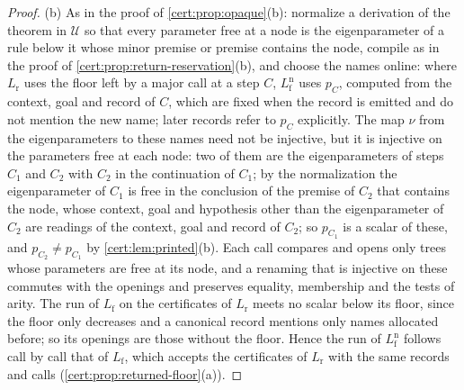 \begin{proof}
(b) As in the proof of \cref{cert:prop:opaque}(b): normalize a derivation of the theorem in
$\mathcal U$ so that every parameter free at a node is the eigenparameter of a rule below it whose
minor premise or premise contains the node, compile as in the proof of
\cref{cert:prop:return-reservation}(b), and choose the names online: where $L_{\mathrm r}$ uses the
floor left by a major call at a step $C$, $L^{\mathrm n}_{\mathrm f}$ uses $p_C$, computed from the
context, goal and record of $C$, which are fixed when the record is emitted and do not mention the new
name; later records refer to $p_C$ explicitly. The map $\nu$ from the eigenparameters to these names
need not be injective, but it is injective on the parameters free at each node: two of them are the
eigenparameters of steps $C_1$ and $C_2$ with $C_2$ in the continuation of $C_1$; by the
normalization the eigenparameter of $C_1$ is free in the conclusion of the premise of $C_2$ that
contains the node, whose context, goal and hypothesis other than the eigenparameter of $C_2$ are
readings of the context, goal and record of $C_2$; so $p_{C_1}$ is a scalar of these, and
$p_{C_2}\neq p_{C_1}$ by \cref{cert:lem:printed}(b). Each call compares and opens only trees whose
parameters are free at its node, and a renaming that is injective on these commutes with the openings
and preserves equality, membership and the tests of arity. The run of $L_{\mathrm f}$ on the
certificates of $L_{\mathrm r}$ meets no scalar below its floor, since the floor only decreases and a
canonical record mentions only names allocated before; so its openings are those without the floor.
Hence the run of $L^{\mathrm n}_{\mathrm f}$ follows call by call that of $L_{\mathrm f}$, which
accepts the certificates of $L_{\mathrm r}$ with the same records and calls
(\cref{cert:prop:returned-floor}(a)).
\end{proof}

